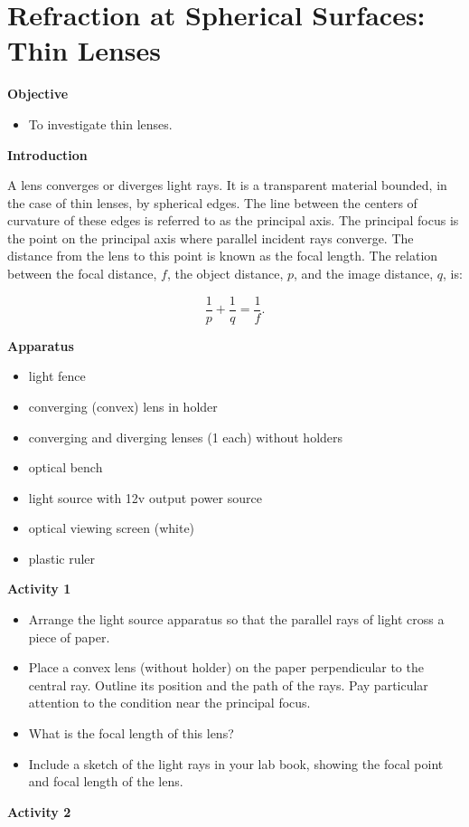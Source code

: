 
\section{Refraction at Spherical Surfaces: Thin Lenses}

\makelabheader %

\textbf{Objective}

\begin{itemize}
\item To investigate thin lenses.
\end{itemize}
\textbf{Introduction} 

A lens converges or diverges light rays. It is a transparent material
bounded, in the case of thin lenses, by spherical edges. The line
between the centers of curvature of these edges is referred to as
the principal axis. The principal focus is the point on the principal
axis where parallel incident rays converge. The distance from the
lens to this point is known as the focal length. The relation between
the focal distance, $f$, the object distance, $p$, and the image distance,
$q$, is:

\begin{displaymath} \frac{1}{p} + \frac{1}{q} = \frac{1}{f}. \end{displaymath}

\textbf{Apparatus}

\begin{itemize}
\item light fence
\item converging (convex) lens in holder
\item converging and diverging lenses (1 each) without holders
\item optical bench 
\item light source with 12v output power source
\item optical viewing screen (white)
\item plastic ruler
\end{itemize}

\textbf{Activity 1}

\begin{itemize}
\item Arrange the light source apparatus so that the parallel rays of light
cross a piece of paper. 
\item Place a convex lens (without holder) on the paper perpendicular to the central ray.
Outline its position and the path of the rays. Pay particular attention
to the condition near the principal focus.
\item What is the focal length of this lens?\vspace{15mm}
\item Include a sketch of the light rays in your lab book, showing the focal point and focal length of the lens.
\end{itemize}
\textbf{Activity 2 }

